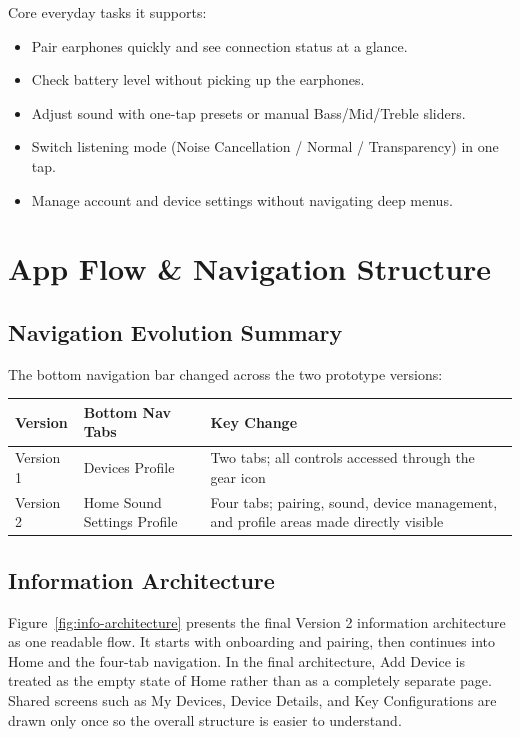 \documentclass[12pt, a4paper]{report}
\begin{document}
Core everyday tasks it supports:

\begin{itemize}
  \item Pair earphones quickly and see connection status at a glance.
  \item Check battery level without picking up the earphones.
  \item Adjust sound with one-tap presets or manual Bass/Mid/Treble sliders.
  \item Switch listening mode (Noise Cancellation / Normal / Transparency) in
    one tap.
  \item Manage account and device settings without navigating deep menus.
\end{itemize}

\chapter{App Flow \& Navigation Structure}

\section{Navigation Evolution Summary}

The bottom navigation bar changed across the two prototype versions:

\begin{center}
  \begin{tabular}{p{3cm} p{5cm} p{5.5cm}}
    \toprule
    \textbf{Version} & \textbf{Bottom Nav Tabs} & \textbf{Key Change} \\
    \midrule
    Version 1 & Devices \textbar{} Profile
      & Two tabs; all controls accessed through the gear icon \\
    Version 2 & Home \textbar{} Sound \textbar{} Settings \textbar{} Profile
      & Four tabs; pairing, sound, device management, and profile areas made directly visible \\
    \bottomrule
  \end{tabular}
\end{center}

\section{Information Architecture}

Figure~\ref{fig:info-architecture} presents the final Version 2 information
architecture as one readable flow. It starts with onboarding and pairing, then
continues into Home and the four-tab navigation. In the final architecture,
Add Device is treated as the empty state of Home rather than as a completely
separate page. Shared screens such as My Devices, Device Details, and Key
Configurations are drawn only once so the overall structure is easier to
understand.
\end{document}
